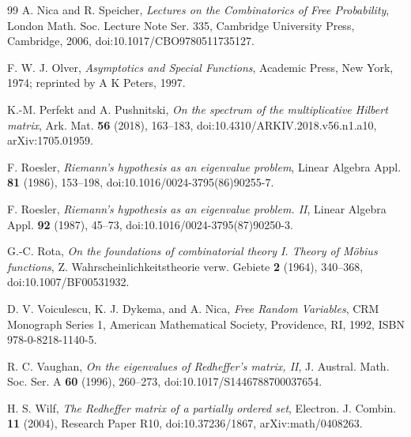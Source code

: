 \documentclass[11pt]{amsart}
\numberwithin{equation}{section}
\theoremstyle{plain}
\theoremstyle{definition}
\theoremstyle{remark}
\begin{document}
\begin{thebibliography}{99}
A. Nica and R. Speicher,
\emph{Lectures on the Combinatorics of Free Probability},
London Math. Soc. Lecture Note Ser. 335, Cambridge University Press, Cambridge, 2006,
doi:10.1017/CBO9780511735127.


F. W. J. Olver,
\emph{Asymptotics and Special Functions},
Academic Press, New York, 1974; reprinted by A K Peters, 1997.

K.-M. Perfekt and A. Pushnitski,
\emph{On the spectrum of the multiplicative Hilbert matrix},
Ark. Mat. \textbf{56} (2018), 163--183,
doi:10.4310/ARKIV.2018.v56.n1.a10,
arXiv:1705.01959.

F. Roesler,
\emph{Riemann's hypothesis as an eigenvalue problem},
Linear Algebra Appl. \textbf{81} (1986), 153--198,
doi:10.1016/0024-3795(86)90255-7.

F. Roesler,
\emph{Riemann's hypothesis as an eigenvalue problem. II},
Linear Algebra Appl. \textbf{92} (1987), 45--73,
doi:10.1016/0024-3795(87)90250-3.

G.-C. Rota,
\emph{On the foundations of combinatorial theory I. Theory of M\"obius functions},
Z. Wahrscheinlichkeitstheorie verw. Gebiete \textbf{2} (1964), 340--368,
doi:10.1007/BF00531932.

D. V. Voiculescu, K. J. Dykema, and A. Nica,
\emph{Free Random Variables},
CRM Monograph Series 1, American Mathematical Society, Providence, RI, 1992,
ISBN 978-0-8218-1140-5.

R. C. Vaughan,
\emph{On the eigenvalues of Redheffer's matrix, II},
J. Austral. Math. Soc. Ser. A \textbf{60} (1996), 260--273,
doi:10.1017/S1446788700037654.

H. S. Wilf,
\emph{The Redheffer matrix of a partially ordered set},
Electron. J. Combin. \textbf{11} (2004), Research Paper R10,
doi:10.37236/1867,
arXiv:math/0408263.

\end{thebibliography}
\endgroup
\end{document}
